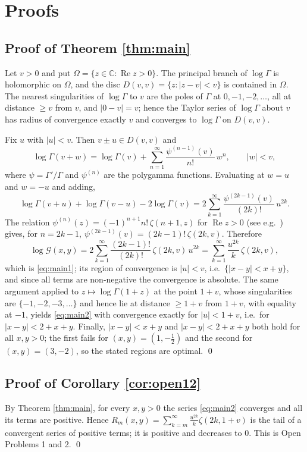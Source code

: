 \documentclass[11pt,a4paper]{amsart}
\theoremstyle{definition}
\newcommand{\Gg}{\mathcal{G}}
\begin{document}
\section{Proofs}\label{sec:proofs}

\subsection{Proof of Theorem \ref{thm:main}}
Let $v>0$ and put $\Omega=\{z\in\mathbb{C}:\operatorname{Re}z>0\}$. The principal branch of
$\log\Gamma$ is holomorphic on $\Omega$, and the disc $D(v,v)=\{z:|z-v|<v\}$ is contained in
$\Omega$. The nearest singularities of $\log\Gamma$ to $v$ are the poles of $\Gamma$ at
$0,-1,-2,\dots$, all at distance $\ge v$ from $v$, and $|0-v|=v$; hence the Taylor series of
$\log\Gamma$ about $v$ has radius of convergence exactly $v$ and converges to $\log\Gamma$
on $D(v,v)$.

Fix $u$ with $|u|<v$. Then $v\pm u\in D(v,v)$ and
\[
  \log\Gamma(v+w)=\log\Gamma(v)+\sum_{n=1}^{\infty}\frac{\psi^{(n-1)}(v)}{n!}\,w^{n},
  \qquad |w|<v ,
\]
where $\psi=\Gamma'/\Gamma$ and $\psi^{(n)}$ are the polygamma functions. Evaluating at
$w=u$ and $w=-u$ and adding,
\[
  \log\Gamma(v+u)+\log\Gamma(v-u)-2\log\Gamma(v)
   =2\sum_{k=1}^{\infty}\frac{\psi^{(2k-1)}(v)}{(2k)!}\,u^{2k}.
\]
The relation $\psi^{(n)}(z)=(-1)^{n+1}n!\,\zeta(n+1,z)$ for $\operatorname{Re}z>0$
(see e.g.\ \cite[\S5.15]{DLMF}) gives, for $n=2k-1$,
$\psi^{(2k-1)}(v)=(2k-1)!\,\zeta(2k,v)$. Therefore
\[
  \log\Gg(x,y)=2\sum_{k=1}^{\infty}\frac{(2k-1)!}{(2k)!}\,\zeta(2k,v)\,u^{2k}
   =\sum_{k=1}^{\infty}\frac{u^{2k}}{k}\,\zeta(2k,v),
\]
which is \eqref{eq:main1}; its region of convergence is $|u|<v$, i.e.\
$\{|x-y|<x+y\}$, and since all terms are non-negative the convergence is absolute. The
same argument applied to $z\mapsto\log\Gamma(1+z)$ at the point $1+v$, whose singularities
are $\{-1,-2,-3,\dots\}$ and hence lie at distance $\ge1+v$ from $1+v$, with equality at
$-1$, yields \eqref{eq:main2} with convergence exactly for $|u|<1+v$, i.e.\ for
$|x-y|<2+x+y$. Finally, $|x-y|<x+y$ and $|x-y|<2+x+y$ both hold for all $x,y>0$; the first
fails for $(x,y)=(1,-\tfrac12)$ and the second for $(x,y)=(3,-2)$, so the stated regions are
optimal. \qed

\subsection{Proof of Corollary \ref{cor:open12}}
By Theorem \ref{thm:main}, for every $x,y>0$ the series \eqref{eq:main2} converges and all
its terms are positive. Hence
$R_{m}(x,y)=\sum_{k=m}^{\infty}\frac{u^{2k}}{k}\zeta(2k,1+v)$
is the tail of a convergent series of positive terms; it is positive and decreases to $0$.
This is Open Problems 1 and 2. \qed
\end{document}
